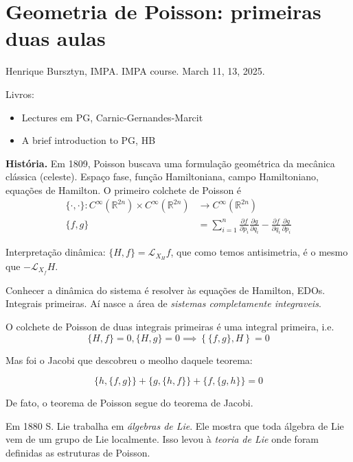 \section{Geometria de Poisson: primeiras duas
aulas}
\label{section-geometria-de-poisson}

\noindent
Henrique Bursztyn, IMPA.
IMPA course.
March 11, 13, 2025.

\medskip
Livros:
\begin{itemize}
\item Lectures em PG, Carnic-Gernandes-Marcit
\item A brief introduction to PG, HB
\end{itemize}

\medskip\noindent
{\bf História.}
Em 1809, Poisson buscava uma formulação
geométrica da mecânica clássica (celeste).
Espaço fase, função Hamiltoniana, campo
Hamiltoniano, equações de Hamilton. O
primeiro colchete de Poisson é
$$
\begin{aligned}
\{\cdot ,\cdot \}:
C^\infty(\mathbb{R}^{2n})\times
C^\infty(\mathbb{R}^{2n}) &\longrightarrow
C^\infty(\mathbb{R}^{2n}) \\
\{f,g\} &=\sum_{i=1}^n \frac{\partial
f}{\partial p_i}\frac{\partial g}{\partial
q_i}-\frac{\partial f}{\partial
q_i}\frac{\partial g}{\partial p_i}
\end{aligned}
$$

Interpretação dinâmica:
$\{H,f\}=\mathcal{L}_{X_H}f$, que como temos
antisimetria, é o mesmo que
$-\mathcal{L}_{X_f}H$.

Conhecer a dinâmica do sistema é resolver às
equações de Hamilton, EDOs. Integrais
primeiras. Aí nasce a área de \emph{sistemas
completamente integraveis}.

\begin{theorem}[de Poisson, 1809]
\label{theorem-bursztyn-poisson}
O colchete de Poisson de duas integrais
primeiras é uma integral primeira, i.e.
$$
\{H,f\}=0,\{H,g\}=0 \implies \left\{
\{f,g\},H \right\} =0
$$
\end{theorem}

Mas foi o Jacobi que descobreu o meolho
daquele teorema:
\begin{theorem}[Jacobi, 1842]
\label{theorem-bursztyn-jacobi}
$$
\{h,\{f,g\}\} +\{g,\{h,f\}\} +\{f,\{g,h\}\}
=0
$$
\end{theorem}
De fato, o teorema de Poisson segue do
teorema de Jacobi.

Em 1880 S. Lie trabalha em \emph{álgebras de
Lie}. Ele mostra que toda álgebra de Lie vem
de um grupo de Lie localmente. Isso levou à
\emph{teoria de Lie} onde foram definidas as
estruturas de Poisson.

